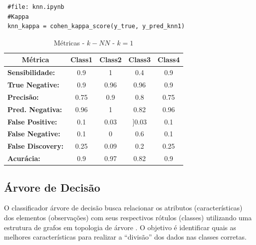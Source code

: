 \documentclass[
	article,			%
	11pt,				%
	oneside,			%
	a4paper,			%
	english,			%
	brazil,				%
	sumario=tradicional
	]{abntex2}
\begin{document}
\begin{verbatim}
 #file: knn.ipynb
 #Kappa
 knn_kappa = cohen_kappa_score(y_true, y_pred_knn1)
\end{verbatim}

\begin{table}[h!]
\centering
\begin{tabular}{|l|c|c|c|c|}
\hline
\multicolumn{1}{|c|}{\textbf{Métrica}} & \textbf{Class1} & \textbf{Class2} & \textbf{Class3} & \textbf{Class4} \\ \hline
\textbf{Sensibilidade:}                & 0.9             & 1               & 0.4             & 0.9             \\ \hline
\textbf{True Negative:}                & 0.9             & 0.96            & 0.96            & 0.9             \\ \hline
\textbf{Precisão:}                     & 0.75            & 0.9             & 0.8             & 0.75            \\ \hline
\textbf{Pred. Negativa:}               & 0.96            & 1               & 0.82            & 0.96            \\ \hline
\textbf{False Positive:}               & 0.1             & 0.03            & {]}0.03         & 0.1             \\ \hline
\textbf{False Negative:}               & 0.1             & 0               & 0.6             & 0.1             \\ \hline
\textbf{False Discovery:}              & 0.25            & 0.09            & 0.2             & 0.25            \\ \hline
\textbf{Acurácia:}                     & 0.9             & 0.97            & 0.82            & 0.9             \\ \hline
\end{tabular}
\caption{Métricas - $k-NN$ - $k=1$}
\label{tab:metrics_knn}
\end{table}

\subsection{Árvore de Decisão}

O classificador árvore de decisão busca relacionar os atributos (características) dos elementos (observações) com seus respectivos rótulos (classes) utilizando uma estrutura de grafos em topologia de árvore \cite{Safavian1991}. O objetivo é identificar quais as melhores características para realizar a ``divisão'' dos dados nas classes corretas.
\end{document}
